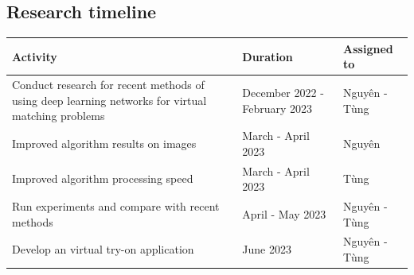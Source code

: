 \documentclass{article}[14pt]
\begin{document}
\subsection{Research timeline}
    

\begin{center}    
    \begin{tabular}{|p{8.5cm}|p{4cm}|p{3.5cm}|}
        \hline
        \textbf{Activity} & \textbf{Duration} & \textbf{Assigned to} \\ 
        \hline
        Conduct research for recent methods of using deep learning networks for virtual matching problems & December 2022 - February 2023 & Nguyên - Tùng \\
        \hline
         Improved algorithm results on images & March - April 2023 & Nguyên \\
        \hline
         Improved algorithm processing speed & March - April 2023 & Tùng \\
         \hline
         Run experiments and compare with recent methods & April - May 2023 & Nguyên - Tùng \\
        \hline
        Develop an virtual try-on application & June 2023 & Nguyên - Tùng \\ 
        \hline
    \end{tabular}
\end{center}

\pagebreak 


\end{document}
